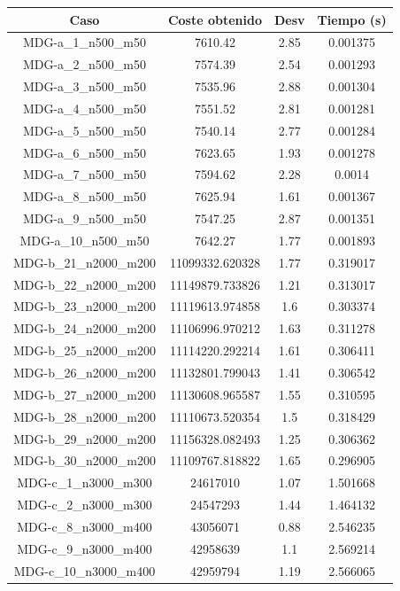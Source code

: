 \documentclass{article}
\begin{document}
\begin{table}[H]
	\centering
	\begin{tabular}{|cccc|}
		\hline
		Caso & Coste obtenido & Desv & Tiempo (s)\\ \hline
		MDG-a\_1\_n500\_m50 & 7610.42 & 2.85 & 0.001375\\
		MDG-a\_2\_n500\_m50 & 7574.39 & 2.54 & 0.001293\\
		MDG-a\_3\_n500\_m50 & 7535.96 & 2.88 & 0.001304\\
		MDG-a\_4\_n500\_m50 & 7551.52 & 2.81 & 0.001281\\
		MDG-a\_5\_n500\_m50 & 7540.14 & 2.77 & 0.001284\\
		MDG-a\_6\_n500\_m50 & 7623.65 & 1.93 & 0.001278\\
		MDG-a\_7\_n500\_m50 & 7594.62 & 2.28 & 0.0014\\
		MDG-a\_8\_n500\_m50 & 7625.94 & 1.61 & 0.001367\\
		MDG-a\_9\_n500\_m50 & 7547.25 & 2.87 & 0.001351\\
		MDG-a\_10\_n500\_m50 & 7642.27 & 1.77 & 0.001893\\
		MDG-b\_21\_n2000\_m200 & 11099332.620328 & 1.77 & 0.319017\\
		MDG-b\_22\_n2000\_m200 & 11149879.733826 & 1.21 & 0.313017\\
		MDG-b\_23\_n2000\_m200 & 11119613.974858 & 1.6 & 0.303374\\
		MDG-b\_24\_n2000\_m200 & 11106996.970212 & 1.63 & 0.311278\\
		MDG-b\_25\_n2000\_m200 & 11114220.292214 & 1.61 & 0.306411\\
		MDG-b\_26\_n2000\_m200 & 11132801.799043 & 1.41 & 0.306542\\
		MDG-b\_27\_n2000\_m200 & 11130608.965587 & 1.55 & 0.310595\\
		MDG-b\_28\_n2000\_m200 & 11110673.520354 & 1.5 & 0.318429\\
		MDG-b\_29\_n2000\_m200 & 11156328.082493 & 1.25 & 0.306362\\
		MDG-b\_30\_n2000\_m200 & 11109767.818822 & 1.65 & 0.296905\\
		MDG-c\_1\_n3000\_m300 & 24617010 & 1.07 & 1.501668\\
		MDG-c\_2\_n3000\_m300 & 24547293 & 1.44 & 1.464132\\
		MDG-c\_8\_n3000\_m400 & 43056071 & 0.88 & 2.546235\\
		MDG-c\_9\_n3000\_m400 & 42958639 & 1.1 & 2.569214\\
		MDG-c\_10\_n3000\_m400 & 42959794 & 1.19 & 2.566065\\

\end{tabular}
\end{table}
\end{document}
